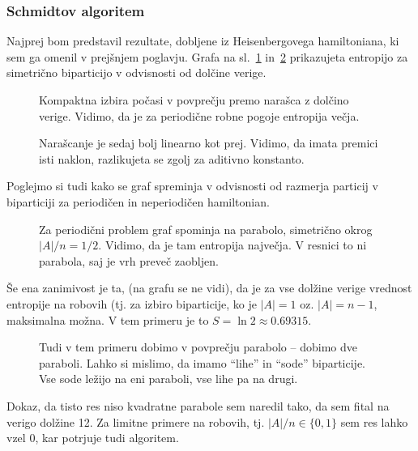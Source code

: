 \documentclass[12pt, a4paper]{article}
\begin{document}
\subsubsection{Schmidtov algoritem}

Najprej bom predstavil rezultate, dobljene iz Heisenbergovega hamiltoniana, ki sem ga omenil v
prej\v snjem poglavju. Grafa na sl.~\ref{1-kompakten} in~\ref{1-nekompakten} prikazujeta entropijo
za simetri\v cno biparticijo v odvisnosti od dol\v cine verige.

\begin{figure}[H]\centering
	
	\caption{Kompaktna izbira po\v casi v povpre\v cju premo nara\v sca z dol\v cino verige.
		Vidimo, da je za periodi\v cne robne pogoje entropija ve\v cja.}
	\label{1-kompakten}
\end{figure}

\begin{figure}[H]\centering
	
	\caption{Nara\v scanje je sedaj bolj linearno kot prej. Vidimo, da imata premici isti naklon,
		razlikujeta se zgolj za aditivno konstanto.}
	\label{1-nekompakten}
\end{figure}

Poglejmo si tudi kako se graf spreminja v odvisnosti od razmerja particij v biparticiji za periodi\v cen in
neperiodi\v cen hamiltonian.

\begin{figure}[H]\centering
	
	\caption{Za periodi\v cni problem graf spominja na parabolo, simetri\v cno okrog $|A|/n = 1/2$. Vidimo, da je
		tam entropija najve\v cja. V resnici to ni parabola, saj je vrh preve\v c zaobljen.}
	\label{1-periodicni-aji}
\end{figure}

\v Se ena zanimivost je ta, (na grafu se ne vidi), da je za vse dol\v zine verige vrednost entropije na robovih (tj.
za izbiro biparticije, ko je $|A| = 1$ oz. $|A| = n-1$, maksimalna mo\v zna. V tem primeru je to $S = \ln 2 \approx 0.69315$.

\begin{figure}[H]\centering
	
	\caption{Tudi v tem primeru dobimo v povpre\v cju parabolo -- dobimo dve paraboli. Lahko si mislimo, da imamo
		"`lihe"' in "`sode"' biparticije. Vse sode le\v zijo na eni paraboli, vse lihe pa na drugi.}
	\label{1-neperiodicni-aji}
\end{figure}

Dokaz, da tisto res niso kvadratne parabole sem naredil tako, da sem fital na verigo dol\v zine 12. Za limitne primere na
robovih, tj. $|A|/n \in \{0,1\}$ sem res lahko vzel $0$, kar potrjuje tudi algoritem.
\end{document}
